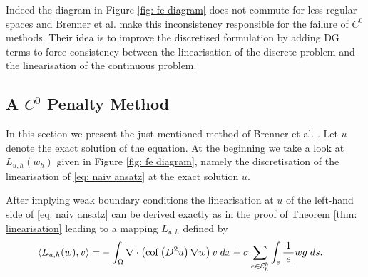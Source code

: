 Indeed the diagram in Figure \ref{fig: fe diagram} does not commute for less regular spaces and Brenner et al. make this inconsistency responsible for the failure of $C^0$ methods\cite{BGN+2011}. Their idea is to improve the discretised formulation by adding DG terms to force consistency between the linearisation of the discrete problem and the linearisation of the continuous problem.

\subsection{A $C^0$ Penalty Method }\label{sec: Brenner method}

In this section we present the just mentioned method of Brenner et al. \cite{BGN+2011}. Let $u$ denote the exact solution of the \MA equation. 
At the beginning we take a look at $L_{u,h}(w_h)$ given in Figure \ref{fig: fe diagram}, namely the discretisation of the linearisation of \eqref{eq: naiv ansatz} at the exact solution $u$.

After implying weak boundary conditions the linearisation at $u$ of the left-hand side of \eqref{eq: naiv ansatz} can be derived exactly as in the proof of Theorem \ref{thm: linearisation} leading to a mapping $L_{u,h}$ defined by
\begin{align}
\langle L_{u,h}(w),v\rangle =& -\int_{\Omega} {{\nabla \cdot \left( \operatorname{cof} \left( D^2 u  \right) \nabla w \right) v}\;dx} 
+ \sigma \sum_{e \in \mathcal{E}_h^b} \int_{e} {{\frac 1 {|e|}{w}{g}}\;ds}.
\label{eq: linearOperator}
\end{align}

